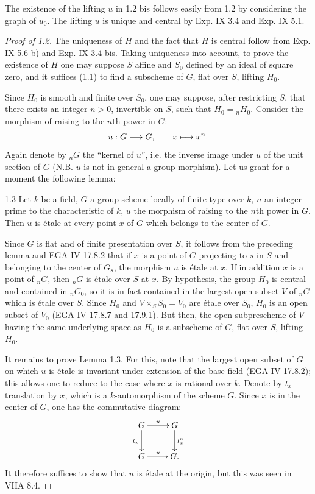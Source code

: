 The existence of the lifting $u$ in 1.2 bis follows easily from 1.2 by considering the graph of $u_0$. The lifting $u$ is unique and central by Exp. IX 3.4 and Exp. IX 5.1.

\begin{proof}[Proof of 1.2]
The uniqueness of $H$ and the fact that $H$ is central follow from Exp. IX 5.6 b) and Exp. IX 3.4 bis. Taking uniqueness into account, to prove the existence of $H$ one may suppose $S$ affine and $S_0$ defined by an ideal of square zero, and it suffices (1.1) to find a subscheme of $G$, flat over $S$, lifting $H_0$.

Since $H_0$ is smooth and finite over $S_0$, one may suppose, after restricting $S$, that there exists an integer $n>0$, invertible on $S$, such that $H_0={}_nH_0$. Consider the morphism of raising to the $n$th power in $G$:
\[
u:G\longrightarrow G,\qquad x\longmapsto x^n.
\]
Again denote by ${}_nG$ the ``kernel of $u$'', i.e. the inverse image under $u$ of the unit section of $G$ (N.B. $u$ is not in general a group morphism). Let us grant for a moment the following lemma:
\begin{lemma}{1.3}\label{XV.1.3}
Let $k$ be a field, $G$ a group scheme locally of finite type over $k$, $n$ an integer prime to the characteristic of $k$, $u$ the morphism of raising to the $n$th power in $G$. Then $u$ is \'etale at every point $x$ of $G$ which belongs to the center of $G$.
\end{lemma}
Since $G$ is flat and of finite presentation over $S$, it follows from the preceding lemma and EGA IV 17.8.2 that if $x$ is a point of $G$ projecting to $s$ in $S$ and belonging to the center of $G_s$, the morphism $u$ is \'etale at $x$. If in addition $x$ is a point of ${}_nG$, then ${}_nG$ is \'etale over $S$ at $x$. By hypothesis, the group $H_0$ is central and contained in ${}_nG_0$, so it is in fact contained in the largest open subset $V$ of ${}_nG$ which is \'etale over $S$. Since $H_0$ and $V\times_S S_0=V_0$ are \'etale over $S_0$, $H_0$ is an open subset of $V_0$ (EGA IV 17.8.7 and 17.9.1). But then, the open subprescheme of $V$ having the same underlying space as $H_0$ is a subscheme of $G$, flat over $S$, lifting $H_0$.

It remains to prove Lemma 1.3. For this, note that the largest open subset of $G$ on which $u$ is \'etale is invariant under extension of the base field (EGA IV 17.8.2); this allows one to reduce to the case where $x$ is rational over $k$. Denote by $t_x$ translation by $x$, which is a $k$-automorphism of the scheme $G$. Since $x$ is in the center of $G$, one has the commutative diagram:
\[
\xymatrix{G\ar[r]^u\ar[d]_{t_x}&G\ar[d]^{t_x^n}\\G\ar[r]^u&G.}
\]
It therefore suffices to show that $u$ is \'etale at the origin, but this was seen in VIIA 8.4.
\end{proof}

